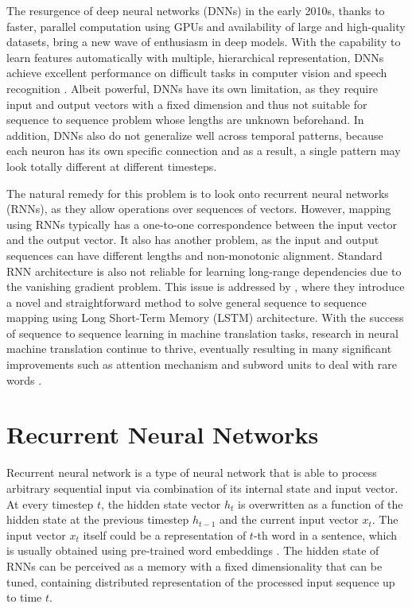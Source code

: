 \documentclass[12pt]{extarticle}
\begin{document}
The resurgence of deep neural networks (DNNs) in the early 2010s, thanks to faster, parallel computation using GPUs and availability of large and high-quality datasets, bring a new wave of enthusiasm in deep models. With the capability to learn features automatically with multiple, hierarchical representation, DNNs achieve excellent performance on difficult tasks in computer vision \citep{Krizhevsky:2012:ICD:2999134.2999257} and speech recognition \citep{ASR}. Albeit powerful, DNNs have its own limitation, as they require input and output vectors with a fixed dimension and thus not suitable for sequence to sequence problem whose lengths are unknown beforehand. In addition, DNNs also do not generalize well across temporal patterns, because each neuron has its own specific connection and as a result, a single pattern may look totally different at different timesteps. 

The natural remedy for this problem is to look onto recurrent neural networks (RNNs), as they allow operations over sequences of vectors. However, mapping using RNNs typically has a one-to-one correspondence between the input vector and the output vector. It also has another problem, as the input and output sequences can have different lengths and non-monotonic alignment. Standard RNN architecture is also not reliable for learning long-range dependencies due to the vanishing gradient problem. This issue is addressed by \citep{Sutskever:2014:SSL:2969033.2969173}, where they introduce a novel and straightforward method to solve general sequence to sequence mapping using Long Short-Term Memory (LSTM) architecture. With the success of sequence to sequence learning in machine translation tasks, research in neural machine translation continue to thrive, eventually resulting in many significant improvements such as attention mechanism \citep{DBLP:journals/corr/BahdanauCB14} and subword units to deal with rare words \citep{sennrich-etal-2016-neural}.

\section*{Recurrent Neural Networks} %

Recurrent neural network \citep{Rumelhart:1986we} is a type of neural network that is able to process arbitrary sequential input via combination of its internal state and input vector. At every timestep $t$, the hidden state vector $h_{t}$ is overwritten as a function of the hidden state at the previous timestep $h_{t-1}$ and the current input vector $x_{t}$. The input vector $x_{t}$ itself could be a representation of $t$-th word in a sentence, which is usually obtained using pre-trained word embeddings \citep{DBLP:journals/corr/abs-1301-3781, pennington-etal-2014-glove, Peters:2018}. The hidden state of RNNs can be perceived as a memory with a fixed dimensionality that can be tuned, containing distributed representation of the processed input sequence up to time $t$. 
\end{document}
